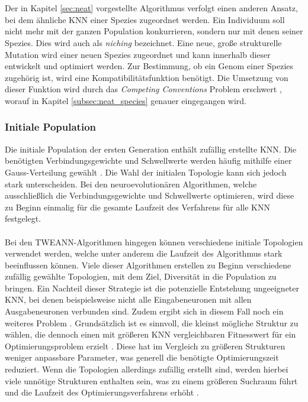 \\\\
Der in Kapitel \ref{sec:neat} vorgestellte Algorithmus verfolgt einen anderen Ansatz, bei dem ähnliche \ac{KNN} einer Spezies zugeordnet werden. Ein Individuum soll nicht mehr mit der ganzen Population konkurrieren, sondern nur mit denen seiner Spezies. Dies wird auch als \emph{niching} bezeichnet. Eine neue, große strukturelle Mutation wird einer neuen Spezies zugeordnet und kann innerhalb dieser entwickelt und optimiert werden. Zur Bestimmung, ob ein Genom einer Spezies zugehörig ist, wird eine Kompatibilitätsfunktion benötigt. Die Umsetzung von dieser Funktion wird durch das \emph{Competing Conventions} Problem erschwert \cite{stanley2002evolving}, worauf in Kapitel \ref{subsec:neat_species} genauer eingegangen wird.
 
\subsubsection{Initiale Population}
Die initiale Population der ersten Generation enthält zufällig erstellte \ac{KNN}. Die benötigten Verbindungsgewichte und Schwellwerte werden häufig mithilfe einer Gauss-Verteilung gewählt \cite{mcintyre_neatpython}. Die Wahl der initialen Topologie kann sich jedoch stark unterscheiden. Bei den neuroevolutionären Algorithmen, welche ausschließlich die Verbindungsgewichte und Schwellwerte optimieren, wird diese zu Beginn einmalig für die gesamte Laufzeit des Verfahrens für alle \ac{KNN} festgelegt.
\\\\
Bei den \ac{TWEANN}-Algorithmen hingegen können verschiedene initiale Topologien verwendet werden, welche unter anderem die Laufzeit des Algorithmus stark beeinflussen können. Viele dieser Algorithmen erstellen zu Beginn verschiedene zufällig gewählte Topologien, mit dem Ziel, Diversität in die Population zu bringen. Ein Nachteil dieser Strategie ist die potenzielle Entstehung ungeeigneter \ac{KNN}, bei denen beispielsweise nicht alle Eingabeneuronen mit allen Ausgabeneuronen verbunden sind. Zudem ergibt sich in diesem Fall noch ein weiteres Problem \cite{stanley2002evolving}. Grundsätzlich ist es sinnvoll, die kleinst mögliche Struktur zu wählen, die dennoch einen mit größeren \ac{KNN} vergleichbaren Fitnesswert für ein Optimierungsproblem erzielt \cite{zhang1993evolving}. Diese hat im Vergleich zu größeren Strukturen weniger anpassbare Parameter, was generell die benötigte Optimierungszeit reduziert. Wenn die Topologien allerdings zufällig erstellt sind, werden hierbei viele unnötige Strukturen enthalten sein, was zu einem größeren Suchraum führt und die Laufzeit des Optimierungsverfahrens erhöht \cite{stanley2002evolving}. 
